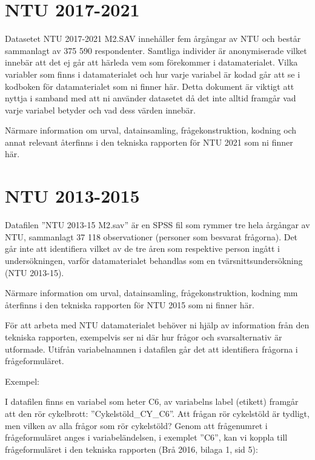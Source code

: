 \documentclass[
]{book}
\begin{document}
\hypertarget{ntu-2017-2021}{%
\section{NTU 2017-2021}\label{ntu-2017-2021}}

Datasetet NTU 2017-2021 M2.SAV innehåller fem årgångar av NTU och består sammanlagt av 375 590 respondenter. Samtliga individer är anonymiserade vilket innebär att det ej går att härleda vem som förekommer i datamaterialet. Vilka variabler som finns i datamaterialet och hur varje variabel är kodad går att se i kodboken för datamaterialet som ni finner här. Detta dokument är viktigt att nyttja i samband med att ni använder datasetet då det inte alltid framgår vad varje variabel betyder och vad dess värden innebär.

Närmare information om urval, datainsamling, frågekonstruktion, kodning och annat relevant återfinns i den
tekniska rapporten för NTU 2021 som ni finner här.

\hypertarget{ntu-2013-2015}{%
\section{NTU 2013-2015}\label{ntu-2013-2015}}

Datafilen ''NTU 2013-15 M2.sav'' är en SPSS fil som rymmer tre hela årgångar av NTU,
sammanlagt 37 118 observationer (personer som besvarat frågorna). Det går inte att identifiera
vilket av de tre åren som respektive person ingått i undersökningen, varför datamaterialet
behandlas som en tvärsnittsundersökning (NTU 2013-15).

Närmare information om urval, datainsamling, frågekonstruktion, kodning mm återfinns i den
tekniska rapporten för NTU 2015 som ni finner här.

För att arbeta med NTU datamaterialet behöver ni hjälp av information från den tekniska
rapporten, exempelvis ser ni där hur frågor och svarsalternativ är utformade.
Utifrån variabelnamnen i datafilen går det att identifiera frågorna i frågeformuläret.

Exempel:

I datafilen finns en variabel som heter C6, av variabelns label (etikett) framgår att den rör
cykelbrott: ''Cykelstöld\_CY\_C6''. Att frågan rör cykelstöld är tydligt, men vilken av alla frågor
som rör cykelstöld? Genom att frågenumret i frågeformuläret anges i variabeländelsen, i
exemplet ''C6'', kan vi koppla till frågeformuläret i den tekniska rapporten (Brå 2016, bilaga 1,
sid 5):
\end{document}
